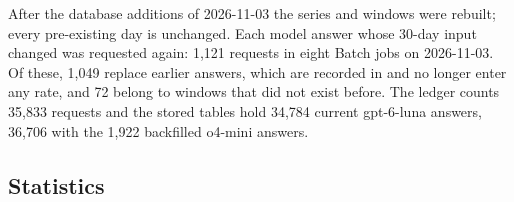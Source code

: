After the database additions of 2026-11-03 the series and windows were rebuilt; every pre-existing day is unchanged. Each model answer whose 30-day input changed was requested again: 1{,}121 requests in eight Batch jobs on 2026-11-03. Of these, 1{,}049 replace earlier answers, which are recorded in  and no longer enter any rate, and 72 belong to windows that did not exist before. The ledger counts 35{,}833 requests and the stored tables hold 34{,}784 current gpt-6-luna answers, 36{,}706 with the 1{,}922 backfilled o4-mini answers.

\subsection{Statistics}
\label{sec:methods:statistics}

